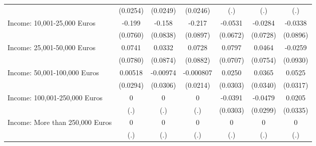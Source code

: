 {\begin{tabular}{l*{6}{c}}
            &    (0.0254)         &    (0.0249)         &    (0.0246)         &         (.)         &         (.)         &         (.)         \\
\addlinespace
Income: 10,001-25,000 Euros&      -0.199\sym{**} &      -0.158         &      -0.217\sym{*}  &     -0.0531         &     -0.0284         &     -0.0338         \\
            &    (0.0760)         &    (0.0838)         &    (0.0897)         &    (0.0672)         &    (0.0728)         &    (0.0896)         \\
\addlinespace
Income: 25,001-50,000 Euros&      0.0741         &      0.0332         &      0.0728         &      0.0797         &      0.0464         &     -0.0259         \\
            &    (0.0780)         &    (0.0874)         &    (0.0882)         &    (0.0707)         &    (0.0754)         &    (0.0930)         \\
\addlinespace
Income: 50,001-100,000 Euros&     0.00518         &    -0.00974         &   -0.000807         &      0.0250         &      0.0365         &      0.0525         \\
            &    (0.0294)         &    (0.0306)         &    (0.0214)         &    (0.0303)         &    (0.0340)         &    (0.0317)         \\
\addlinespace
Income: 100,001-250,000 Euros&           0         &           0         &           0         &     -0.0391         &     -0.0479         &      0.0205         \\
            &         (.)         &         (.)         &         (.)         &    (0.0303)         &    (0.0299)         &    (0.0335)         \\
\addlinespace
Income: More than 250,000 Euros&           0         &           0         &           0         &           0         &           0         &           0         \\
            &         (.)         &         (.)         &         (.)         &         (.)         &         (.)         &         (.)         \\
\bottomrule
\end{tabular}
}
